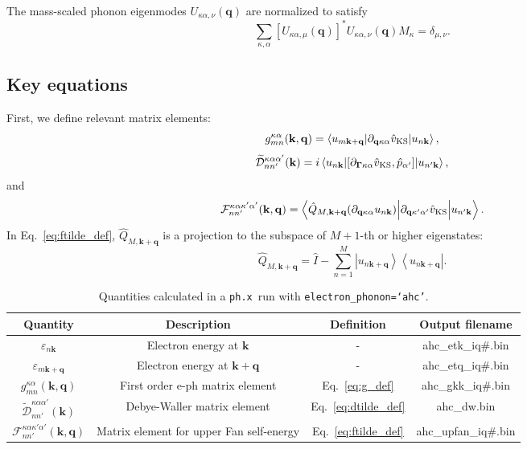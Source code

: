 \documentclass[12pt,a4paper]{article}
\def\phx{\texttt{ph.x}}
\newcommand{\mb}[1]{\mathbf{#1}}
\newcommand{\nk}[0]{{n\mathbf{k}}}
\newcommand{\npk}[0]{{n'\mathbf{k}}}
\newcommand{\mkq}[0]{{m\mathbf{k}+\mathbf{q}}}
\newcommand{\qka}[0]{{\mb{q}\kappa\alpha}}
\newcommand{\qkpap}[0]{{\mb{q}\kappa'\alpha'}}
\newcommand{\veps}[0]{\varepsilon}
\newcommand{\duGka}[0]{{\partial_{\mb{\Gamma}\kappa\alpha}}}
\newcommand{\vks}[0]{{\hat{v}_{\rm KS}}}
\newcommand{\dtilde}[0]{{\widetilde{\mathcal{D}}}}
\newcommand{\bra}[1]{\left\langle {#1} \right|}
\newcommand{\ket}[1]{\left| {#1} \right\rangle}
\newcommand{\mel}[3]{\left\langle{#1}\middle|{#2}\middle|{#3}\right\rangle}
\begin{document}
The mass-scaled phonon eigenmodes $U_{\kappa\alpha,\nu}(\mb{q})$ are normalized
to satisfy
\begin{equation} \label{eq:u_normalize}
    \sum_{\kappa,\alpha} [U_{\kappa\alpha,\mu}(\mb{q})]^*
    U_{\kappa\alpha,\nu}(\mb{q}) M_\kappa = \delta_{\mu,\nu}.
\end{equation}

\subsection{Key equations}

First, we define relevant matrix elements:
\begin{equation} \label{eq:g_def}
    g_{mn}^{\kappa\alpha}(\mb{k},\mb{q})
    = \mel{u_{\mkq}}{\partial_\qka \vks}{u_{\nk}},
\end{equation}
\begin{equation} \label{eq:dtilde_def}
    \dtilde_{nn'}^{\kappa\alpha\alpha'}(\mb{k})
    = i \mel{u_{\nk}}{[\duGka \vks, \hat{p}_{\alpha'}]}{u_{\npk}},
\end{equation}
and
\begin{equation} \label{eq:ftilde_def}
    \mathcal{F}_{nn'}^{\kappa\alpha\kappa'\alpha'}(\mb{k},\mb{q})
    = \mel{\hat{Q}_{M, \mb{k+q}} (\partial_\qka u_{\nk})}
    {\partial_\qkpap \vks}{u_{\npk}}.
\end{equation}
In Eq.~\eqref{eq:ftilde_def}, $\hat{Q}_{M, \mb{k+q}}$ is a projection to the
subspace of $M+1$-th or higher eigenstates:
\begin{equation} \label{eq:QM_def}
    \hat{Q}_{M, \mb{k+q}}
    = \hat{I} - \sum_{n=1}^{M} \ket{u_{n\mb{k+q}}}\bra{u_{n\mb{k+q}}}.
\end{equation}

\begin{table}[]
\centering
\begin{tabular}{|c|c|c|c|}
\hline
Quantity & Description & Definition & Output filename \\ \hline
$\veps_{\nk}$ & Electron energy at $\mb{k}$ &- & ahc\_etk\_iq\#.bin \\ \hline
$\veps_{\mkq}$ & Electron energy at $\mb{k+q}$ & - & ahc\_etq\_iq\#.bin \\ \hline
$g_{mn}^{\kappa\alpha}(\mb{k},\mb{q})$ & First order e-ph matrix element
& Eq.~\eqref{eq:g_def} & ahc\_gkk\_iq\#.bin \\ \hline
$\dtilde_{nn'}^{\kappa\alpha\alpha'}(\mb{k})$ & Debye-Waller matrix element
& Eq.~\eqref{eq:dtilde_def} & ahc\_dw.bin \\ \hline
$\mathcal{F}_{nn'}^{\kappa\alpha\kappa'\alpha'}(\mb{k},\mb{q})$
& Matrix element for upper Fan self-energy
& Eq.~\eqref{eq:ftilde_def} & ahc\_upfan\_iq\#.bin \\ \hline
\end{tabular}
\caption{Quantities calculated in a \phx\ run with
\texttt{electron\_phonon=`ahc'}.}
\end{table}
\end{document}
